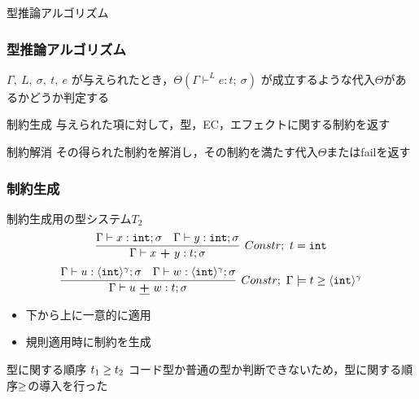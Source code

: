 \begin{frame}
  \center
  \huge{型推論アルゴリズム}
\end{frame}

\begin{frame}
  \frametitle{型推論アルゴリズム}

  $\Gamma,~ L,~ \sigma,~ t,~ e$ が与えられたとき，$\Theta(\Gamma \vdash^{L} e : t ;~\sigma)$ が成立するような代入$\Theta$があるかどうか判定する

  \begin{exampleblock}{制約生成}
    与えられた項に対して，型，EC，エフェクトに関する制約を返す
  \end{exampleblock}
  \begin{exampleblock}{制約解消}
    その得られた制約を解消し，その制約を満たす代入$\Theta$またはfailを返す
  \end{exampleblock}
\end{frame}



\begin{frame}
  \frametitle{制約生成}
  \begin{exampleblock}{制約生成用の型システム$T_2$}
    \[
      \infer[Constr;~ t = \intT]
      {\Gamma \vdash x~ \Plus~ y: t; \sigma}
      {\Gamma \vdash x: \intT ; \sigma & \Gamma \vdash y: \intT ; \sigma}
    \]
    \vspace{-1.2zh}
    \[
      \infer[Constr;~ \Gamma \models \longer{t}{\codeT{\intT}{\gamma}}]
      {\Gamma \vdash u~ \cPlus~ w: t; \sigma}
      {\Gamma \vdash u: \codeT{\intT}{\gamma}; \sigma & \Gamma \vdash w: \codeT{\intT}{\gamma}; \sigma}
    \]

    \begin{itemize}
    \item 下から上に一意的に適用
    \item 規則適用時に制約を生成
    \end{itemize}
  \end{exampleblock}
  \begin{exampleblock}{型に関する順序 ${t_1} \ge {t_2}$}
    コード型か普通の型か判断できないため，型に関する順序$\ge$の導入を行った
  \end{exampleblock}
\end{frame}

